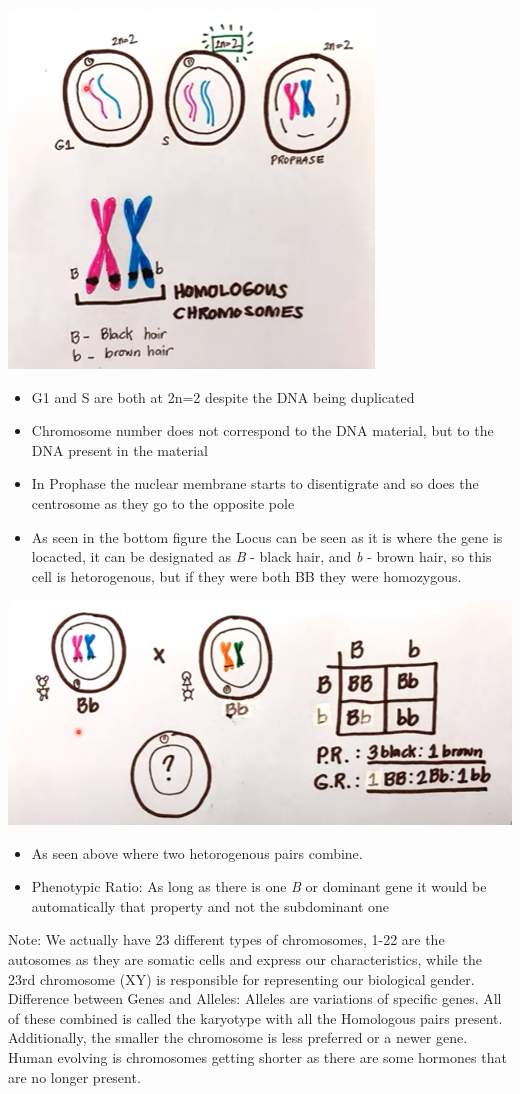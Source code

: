 \documentclass{article}
\begin{document}
\includegraphics[scale=0.7]{G1SPDrawing.png}
\begin{itemize}
    \item G1 and S are both at 2n=2 despite the DNA being duplicated
    \item Chromosome number does not correspond to the DNA material, but to the DNA present in the material
    \item In Prophase the nuclear membrane starts to disentigrate and so does the centrosome as they go to the opposite pole
    \item As seen in the bottom figure the Locus can be seen as it is where the gene is locacted, it can be designated as \textit{B} - black hair, and \textit{b} - brown hair, so this cell is hetorogenous, but if they were both BB they were homozygous.
\end{itemize}
\includegraphics[scale=0.5]{BbBb.png}
\begin{itemize}
    \item As seen above where two hetorogenous pairs combine.
    \item Phenotypic Ratio: As long as there is one \textit{B} or dominant gene it would be automatically that property and not the subdominant one
\end{itemize}
Note: We actually have 23 different types of chromosomes, 1-22 are  the autosomes as they are somatic cells and express our characteristics, while the 23rd chromosome (XY) is responsible for representing our biological gender.
Difference between Genes and Alleles: Alleles are variations of specific genes. All of these combined is called the karyotype with all the Homologous pairs present. Additionally, the smaller the chromosome is less preferred or a newer gene. Human evolving is chromosomes getting shorter as there are some hormones that are no longer present.
\end{document}
